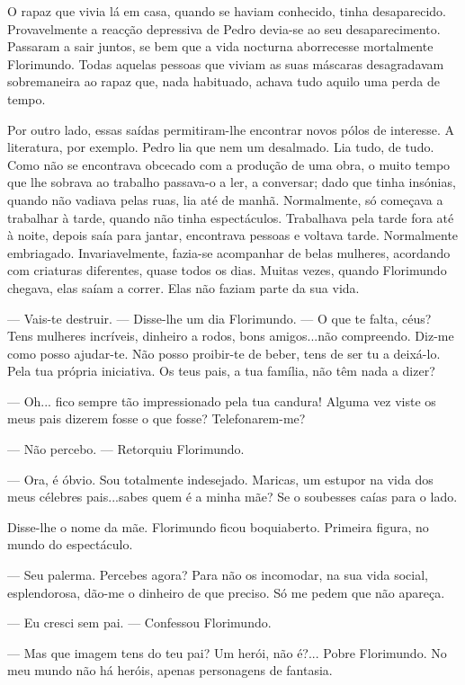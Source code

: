 O rapaz que vivia lá em casa, quando se haviam conhecido, tinha
desaparecido. Provavelmente a reacção depressiva de Pedro devia-se ao
seu desaparecimento. Passaram a sair juntos, se bem que a vida nocturna
aborrecesse mortalmente Florimundo. Todas aquelas pessoas que viviam as
suas máscaras desagradavam sobremaneira ao rapaz que, nada habituado,
achava tudo aquilo uma perda de tempo.

Por outro lado, essas saídas permitiram-lhe encontrar novos pólos de
interesse. A literatura, por exemplo. Pedro lia que nem um desalmado.
Lia tudo, de tudo. Como não se encontrava obcecado com a produção de uma
obra, o muito tempo que lhe sobrava ao trabalho passava-o a ler, a
conversar; dado que tinha insónias, quando não vadiava pelas ruas, lia
até de manhã. Normalmente, só começava a trabalhar à tarde, quando não
tinha espectáculos. Trabalhava pela tarde fora até à noite, depois saía
para jantar, encontrava pessoas e voltava tarde. Normalmente embriagado.
Invariavelmente, fazia-se acompanhar de belas mulheres, acordando com
criaturas diferentes, quase todos os dias. Muitas vezes, quando
Florimundo chegava, elas saíam a correr. Elas não faziam parte da sua
vida.

--- Vais-te destruir. --- Disse-lhe um dia Florimundo. --- O que te falta,
céus? Tens mulheres incríveis, dinheiro a rodos, bons amigos...não
compreendo. Diz-me como posso ajudar-te. Não posso proibir-te de beber,
tens de ser tu a deixá-lo. Pela tua própria iniciativa. Os teus pais, a
tua família, não têm nada a dizer?

--- Oh... fico sempre tão impressionado pela tua candura! Alguma vez viste
os meus pais dizerem fosse o que fosse? Telefonarem-me?

--- Não percebo. --- Retorquiu Florimundo.

--- Ora, é óbvio. Sou totalmente indesejado. Maricas, um estupor na vida
dos meus célebres pais...sabes quem é a minha mãe? Se o soubesses caías
para o lado.

Disse-lhe o nome da mãe. Florimundo ficou boquiaberto. Primeira figura,
no mundo do espectáculo.

--- Seu palerma. Percebes agora? Para não os incomodar, na sua vida
social, esplendorosa, dão-me o dinheiro de que preciso. Só me pedem que
não apareça.

--- Eu cresci sem pai. --- Confessou Florimundo.

--- Mas que imagem tens do teu pai? Um herói, não é?... Pobre Florimundo.
No meu mundo não há heróis, apenas personagens de fantasia.

